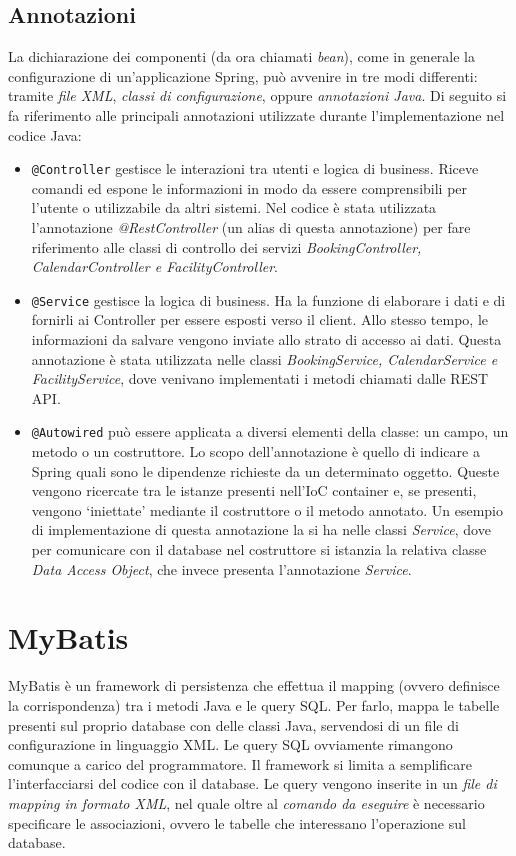 \subsection{Annotazioni}
La dichiarazione dei componenti (da ora chiamati \emph{bean}), come in generale la configurazione di un’applicazione Spring, può avvenire in tre modi differenti: tramite \textit{file XML}, \textit{classi di configurazione}, oppure \textit{annotazioni Java}. Di seguito si fa riferimento alle principali annotazioni utilizzate durante l'implementazione nel codice Java:
\begin{itemize} 
    \item \texttt{@Controller} gestisce le interazioni tra utenti e logica di business. Riceve comandi ed espone le informazioni in modo da essere comprensibili per l’utente o utilizzabile da altri sistemi. Nel codice è stata utilizzata l'annotazione \emph{@RestController} (un alias di questa annotazione) per fare riferimento alle classi di controllo dei servizi \textit{BookingController, CalendarController e FacilityController}.
    \item \texttt{@Service} gestisce la logica di business. Ha la funzione di elaborare i dati e di fornirli ai Controller per essere esposti verso il client. Allo stesso tempo, le informazioni da salvare vengono inviate allo strato di accesso ai dati. Questa annotazione è stata utilizzata nelle classi \textit{BookingService, CalendarService e FacilityService}, dove venivano implementati i metodi chiamati dalle REST API.
    \item \texttt{@Autowired} può essere applicata a diversi elementi della classe: un campo, un metodo o un costruttore. Lo scopo dell'annotazione è quello di indicare a Spring quali sono le dipendenze richieste da un determinato oggetto. Queste vengono ricercate tra le istanze presenti nell'IoC container e, se presenti, vengono `iniettate' mediante il costruttore o il metodo annotato. Un esempio di implementazione di questa annotazione la si ha nelle classi \emph{Service}, dove per comunicare con il database nel costruttore si istanzia la relativa classe \textit{Data Access Object}, che invece presenta l'annotazione \emph{Service}.
\end{itemize}

\section{MyBatis}
MyBatis è un framework di persistenza che effettua il mapping (ovvero definisce la corrispondenza) tra i metodi Java e le query SQL. Per farlo, mappa le tabelle presenti sul proprio database con delle classi Java, servendosi di un file di configurazione in linguaggio XML. Le query SQL ovviamente rimangono comunque a carico del programmatore. Il framework si limita a semplificare l’interfacciarsi del codice con il database. Le query vengono inserite in un \emph{file di mapping in formato XML}, nel quale oltre al \textit{comando da eseguire} è necessario specificare le associazioni, ovvero le tabelle che interessano l'operazione sul database.

